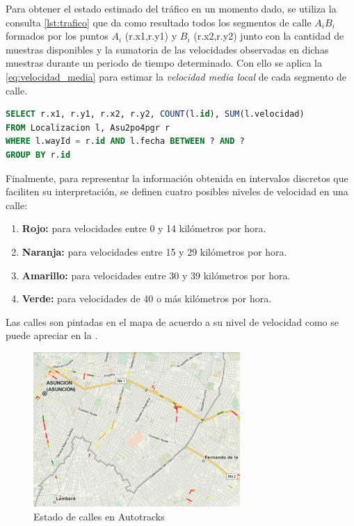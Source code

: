 Para obtener el estado estimado del tráfico en un momento dado, se utiliza la consulta \ref{lst:trafico} que da como resultado todos los segmentos de calle $A_iB_i$ formados por los puntos $A_i$ (r.x1,r.y1) y $B_i$ (r.x2,r.y2) junto con la cantidad de muestras disponibles y la sumatoria de las velocidades observadas en dichas muestras durante un periodo de tiempo determinado. Con ello se aplica la \cref{eq:velocidad_media} para estimar la \emph{velocidad media local} de cada segmento de calle.

\renewcommand\lstlistingname{Consulta}
\begin{lstlisting}[caption={Obtención de datos de tráfico},label={lst:trafico},language=SQL]
SELECT r.x1, r.y1, r.x2, r.y2, COUNT(l.id), SUM(l.velocidad)
FROM Localizacion l, Asu2po4pgr r
WHERE l.wayId = r.id AND l.fecha BETWEEN ? AND ?
GROUP BY r.id
\end{lstlisting}

Finalmente, para representar la información obtenida en intervalos discretos que faciliten su interpretación, se definen cuatro posibles niveles de velocidad en una calle:
\begin{enumerate}
\item \textbf{Rojo:}  para velocidades entre 0 y 14 kilómetros por hora.
\item \textbf{Naranja:}  para velocidades entre 15 y 29 kilómetros por hora.
\item \textbf{Amarillo:}  para velocidades entre 30 y 39 kilómetros por hora.
\item \textbf{Verde:}  para velocidades de 40 o más kilómetros por hora.
\end{enumerate}
Las calles son pintadas en el mapa de acuerdo a su nivel de velocidad como se puede apreciar en la .
\begin{figure}[h]
	\centering
	\includegraphics[width=0.7\textwidth]{capitulos/6/figuras/figura3.jpg}
	\caption{\label{fig:calles} Estado de calles en Autotracks}	
\end{figure}
